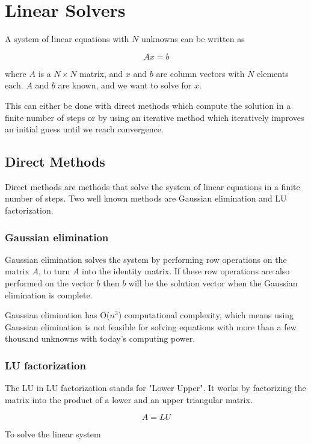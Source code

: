 \section{Linear Solvers}

A system of linear equations with $N$ unknowns can be written as 

$$Ax = b$$

where $A$ is a $N \times N$ matrix, and $x$ and $b$ are column vectors with $N$ 
elements each. $A$ and $b$ are known, and we want to solve for $x$.

This can either be done with direct methods which compute the solution in a finite 
number of steps or by using an iterative method which iteratively improves an initial 
guess until we reach convergence. 

\subsection{Direct Methods}

Direct methods are methods that solve the system of linear equations in a finite
number of steps. Two well known methods are Gaussian elimination and LU factorization.

\subsubsection{Gaussian elimination}

Gaussian elimination solves the system by performing row operations on the matrix 
$A$, to turn $A$ into the identity matrix. If these row operations are also performed 
on the vector $b$ then $b$ will be the solution vector when the Gaussian elimination 
is complete.

Gaussian elimination has O($n^3$) computational complexity, which means using 
Gaussian elimination is not feasible for solving equations with more than a few 
thousand unknowns with today's computing power.

\subsubsection{LU factorization}

The LU in LU factorization stands for "Lower Upper". It works by factorizing the 
matrix into the product of a lower and an upper triangular matrix. 

$$A = LU$$

To solve the linear system 


